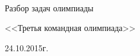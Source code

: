 \begin{titlepage}
\newpage
{}

~\vspace{5cm}

\Large{Разбор задач олимпиады}

\Large{<<Третья командная олимпиада>>}

\Large{24.10.2015г.}

\end{titlepage}
